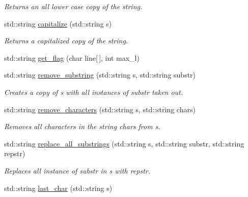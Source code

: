 \begin{DoxyCompactItemize}
\begin{DoxyCompactList}\small\item\em Returns an all lower case copy of the string. \end{DoxyCompactList}\item 
\hypertarget{namespacepyne_a8855d064ba8f0c3ab7b85aa9788c9673}{std\+::string \hyperlink{namespacepyne_a8855d064ba8f0c3ab7b85aa9788c9673}{capitalize} (std\+::string s)}\label{namespacepyne_a8855d064ba8f0c3ab7b85aa9788c9673}

\begin{DoxyCompactList}\small\item\em Returns a capitalized copy of the string. \end{DoxyCompactList}\item 
std\+::string \hyperlink{namespacepyne_ab883f7c602f63e87fae5c2f48cfed0f8}{get\+\_\+flag} (char line\mbox{[}$\,$\mbox{]}, int max\+\_\+l)
\item 
\hypertarget{namespacepyne_adf03d1957dc2420ef99554c6fe4c4ec0}{std\+::string \hyperlink{namespacepyne_adf03d1957dc2420ef99554c6fe4c4ec0}{remove\+\_\+substring} (std\+::string s, std\+::string substr)}\label{namespacepyne_adf03d1957dc2420ef99554c6fe4c4ec0}

\begin{DoxyCompactList}\small\item\em Creates a copy of {\itshape s} with all instances of {\itshape substr} taken out. \end{DoxyCompactList}\item 
\hypertarget{namespacepyne_ae6154cc77d52eaeb50b1e35f043c1070}{std\+::string \hyperlink{namespacepyne_ae6154cc77d52eaeb50b1e35f043c1070}{remove\+\_\+characters} (std\+::string s, std\+::string chars)}\label{namespacepyne_ae6154cc77d52eaeb50b1e35f043c1070}

\begin{DoxyCompactList}\small\item\em Removes all characters in the string {\itshape chars} from {\itshape s}. \end{DoxyCompactList}\item 
\hypertarget{namespacepyne_a181f9781cb5da2ca18b1946792996268}{std\+::string \hyperlink{namespacepyne_a181f9781cb5da2ca18b1946792996268}{replace\+\_\+all\+\_\+substrings} (std\+::string s, std\+::string substr, std\+::string repstr)}\label{namespacepyne_a181f9781cb5da2ca18b1946792996268}

\begin{DoxyCompactList}\small\item\em Replaces all instance of {\itshape substr} in {\itshape s} with {\itshape repstr}. \end{DoxyCompactList}\item 
\hypertarget{namespacepyne_a97495e780a8fd91e4604e5a7b2f84f3e}{std\+::string \hyperlink{namespacepyne_a97495e780a8fd91e4604e5a7b2f84f3e}{last\+\_\+char} (std\+::string s)}\label{namespacepyne_a97495e780a8fd91e4604e5a7b2f84f3e}


\end{DoxyCompactItemize}
